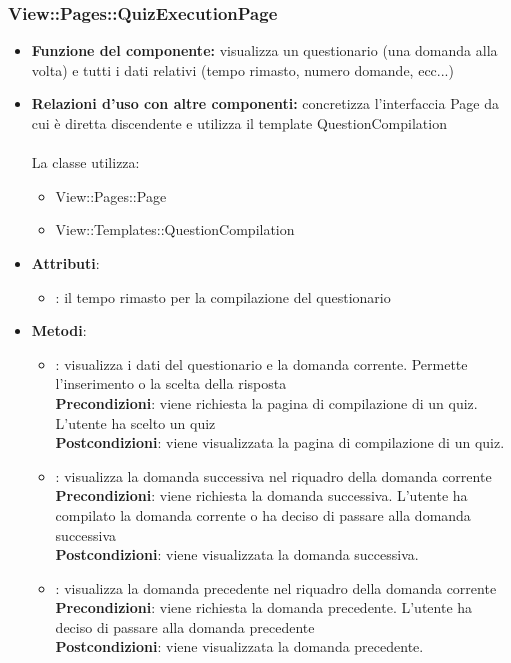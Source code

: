 \subsubsection{View::Pages::QuizExecutionPage}
\begin{itemize}
\item\textbf{Funzione del componente:} visualizza un questionario (una domanda alla volta) e tutti i dati relativi (tempo rimasto, numero domande, ecc...)
				\item\textbf{Relazioni d'uso con altre componenti:} concretizza l'interfaccia Page da cui è diretta discendente e utilizza il template QuestionCompilation\\ \\
La classe utilizza:
	\begin{itemize}
		\item View::Pages::Page\\
		\item View::Templates::QuestionCompilation\\
	\end{itemize}
\item\textbf{Attributi}:
	\begin{itemize}
		\item{}: il tempo rimasto per la compilazione del questionario\\
	\end{itemize}
\item\textbf{Metodi}:
	\begin{itemize}
		\item{}: visualizza i dati del questionario e la domanda corrente. Permette l'inserimento o la scelta della risposta\\
			\textbf{Precondizioni}: viene richiesta la pagina di compilazione di un quiz. L'utente ha scelto un quiz\\
			\textbf{Postcondizioni}: viene visualizzata la pagina di compilazione di un quiz.\\
		\item{}: visualizza la domanda successiva nel riquadro della domanda corrente\\
			\textbf{Precondizioni}: viene richiesta la domanda successiva. L'utente ha compilato la domanda corrente o ha deciso di passare alla domanda successiva\\
			\textbf{Postcondizioni}: viene visualizzata la domanda successiva.\\
		\item{}: visualizza la domanda precedente nel riquadro della domanda corrente\\
			\textbf{Precondizioni}: viene richiesta la domanda precedente. L'utente ha deciso di passare alla domanda precedente\\
			\textbf{Postcondizioni}: viene visualizzata la domanda precedente.\\
	\end{itemize}
\end{itemize}

